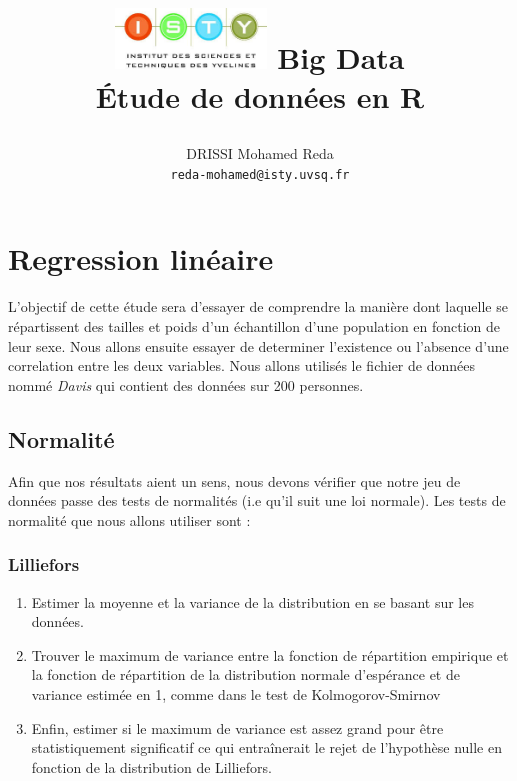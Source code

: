 \documentclass{report}
\begin{document}
\title{
  \begin{minipage}\linewidth
      \centering
      \includegraphics[width=40mm]{resources/01.png}\vskip 20pt
      \Huge Big Data \\ Étude de données en R
      \vskip 5pt
      \author{
        DRISSI Mohamed Reda \\
        \texttt{reda-mohamed@isty.uvsq.fr}
      }
    \end{minipage}
}
\maketitle
\newpage
\tableofcontents
\newpage
\section{Regression linéaire }
L'objectif de cette étude sera d'essayer de comprendre
la manière dont laquelle se répartissent des tailles et poids d'un
échantillon d'une population en fonction de leur sexe. Nous
allons ensuite essayer de determiner l'existence ou l'absence
d'une correlation entre les deux variables.
Nous allons utilisés le fichier de données nommé \textit{Davis} qui
contient des données sur 200 personnes.
\subsection{Normalité}
Afin que nos résultats aient un sens, nous devons vérifier
que notre jeu de données passe des tests de normalités (i.e
qu'il suit une loi normale).
Les tests de normalité que nous allons utiliser sont :
\subsubsection{Lilliefors}
\begin{enumerate}
  \item  Estimer la moyenne et la variance de la distribution en se basant sur les données.
  \item Trouver le maximum de variance entre la fonction de répartition empirique et la fonction de répartition de la distribution normale d'espérance et de variance estimée en 1, comme dans le test de Kolmogorov-Smirnov
  \item Enfin, estimer si le maximum de variance est assez grand pour être statistiquement significatif ce qui entraînerait le rejet de l'hypothèse nulle en fonction de la distribution de Lilliefors.
\end{enumerate}
\end{document}
